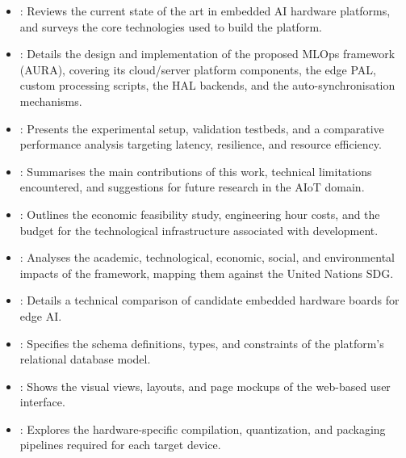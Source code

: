 \begin{itemize}
    \item \textbf{}: Reviews the current state of the art in embedded \gls{AI} hardware platforms, and surveys the core technologies used to build the platform. 
    \item \textbf{}: Details the design and implementation of the proposed \gls{MLOps} framework (AURA), covering its cloud/server platform components, the edge \gls{PAL}, custom processing scripts, the \gls{HAL} backends, and the auto-synchronisation mechanisms.
    \item \textbf{}: Presents the experimental setup, validation testbeds, and a comparative performance analysis targeting latency, resilience, and resource efficiency.
    \item \textbf{}: Summarises the main contributions of this work, technical limitations encountered, and suggestions for future research in the \gls{AIoT} domain.
    \item \textbf{}: Outlines the economic feasibility study, engineering hour costs, and the budget for the technological infrastructure associated with development.
    \item \textbf{}: Analyses the academic, technological, economic, social, and environmental impacts of the framework, mapping them against the United Nations \gls{SDG}.
    \item \textbf{}: Details a technical comparison of candidate embedded hardware boards for edge \gls{AI}.
    \item \textbf{}: Specifies the schema definitions, types, and constraints of the platform's relational database model.
    \item \textbf{}: Shows the visual views, layouts, and page mockups of the web-based user interface.
    \item \textbf{}: Explores the hardware-specific compilation, quantization, and packaging pipelines required for each target device.
\end{itemize}


